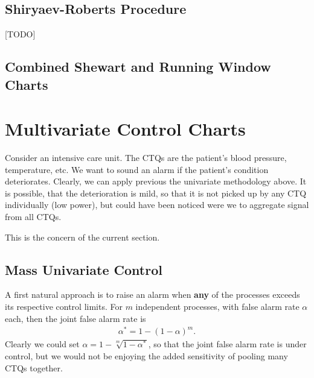 \subsection{Shiryaev-Roberts Procedure}
[TODO]





\subsection{Combined Shewart and Running Window Charts}






\begin{extra}
\end{extra}








\section[Multivariate]{Multivariate Control Charts}
\label{sec:multivariate}

\begin{example}
\label{eg:intensive}
Consider an intensive care unit. 
The CTQs are the patient's blood pressure, temperature, etc.
We want to sound an alarm if the patient's condition deteriorates. 
Clearly, we can apply previous the univariate methodology above. 
It is possible, that the deterioration is mild, so that it is not picked up by any CTQ individually (low power), but could have been noticed were we to aggregate signal from all CTQs. 
\end{example}
This is the concern of the current section. 

\subsection{Mass Univariate Control}
\label{sec:mass_univariate}

A first natural approach is to raise an alarm when \textbf{any} of the processes exceeds its respective control limits.
For $m$ independent processes, with false alarm rate $\alpha$ each, then the joint false alarm rate is 
\begin{align}
	\alpha^* = 1-(1-\alpha)^m.
\end{align}
Clearly we could set $\alpha=1-\sqrt[m]{1-\alpha^*}$, so that the joint false alarm rate is under control, but we would not be enjoying the added sensitivity of pooling many CTQs together. 



